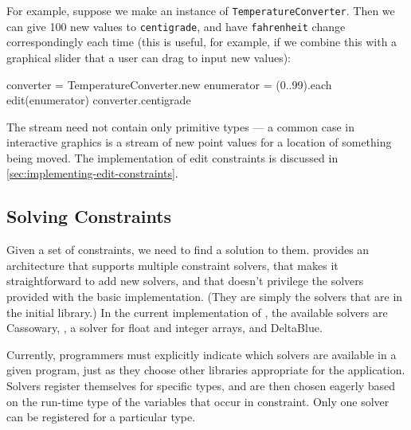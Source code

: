 For example, suppose we make an instance of
\lstinline{TemperatureConverter}.  Then we can give 100 new values to
\lstinline{centigrade}, and have \lstinline{fahrenheit} change
correspondingly each time (this is useful, for example, if we combine
this with a graphical slider that a user can drag to input new
values):

\begin{code}
converter = TemperatureConverter.new
enumerator = (0..99).each
edit(enumerator) {converter.centigrade}
\end{code}

The stream need not contain only primitive types --- a common case in
interactive graphics is a stream of new point values for a location of
something being moved.  The implementation of edit constraints is
discussed in \autoref{sec:implementing-edit-constraints}.

\subsection{Solving Constraints}
\label{sec:solvers}
Given a set of constraints, we need to find a solution to them.
\langname provides an architecture that supports multiple constraint
solvers, that makes it straightforward to add new solvers, and that
doesn't privilege the solvers provided with the basic implementation.
(They are simply the solvers that are in the initial library.)  In the
current implementation of \toolname, the available solvers are
Cassowary, \zthree, a solver for float and integer arrays, and
DeltaBlue.

Currently, programmers must explicitly indicate which solvers are
available in a given program, just as they choose other libraries
appropriate for the application. Solvers register themselves for
specific types, and are then chosen eagerly based on the run-time type
of the variables that occur in \DIFdelbegin {}\DIFdelend \DIFaddbegin {}\DIFaddend constraint.  Only one solver can
be registered for a particular type. 


